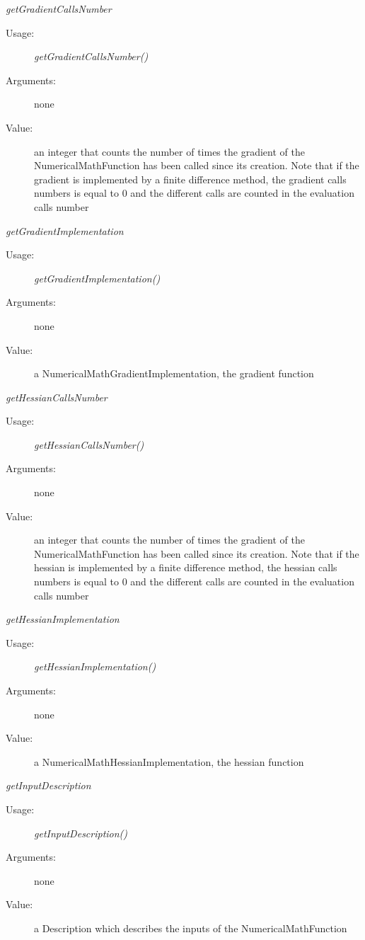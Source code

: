 \begin{description}
\begin{description}
\item \textit{getGradientCallsNumber}
\begin{description}
\item[Usage:] \textit{getGradientCallsNumber()}
\item[Arguments:] none
\item[Value:] an integer that counts the number of times the gradient of the NumericalMathFunction has been called since its creation. Note that if the gradient is implemented by a finite difference method, the gradient calls numbers is equal to 0 and the different calls are counted in the evaluation calls number
\end{description}
\bigskip

\item \textit{getGradientImplementation}
\begin{description}
\item[Usage:] \textit{getGradientImplementation()}
\item[Arguments:] none
\item[Value:] a NumericalMathGradientImplementation, the gradient function
\end{description}
\bigskip

\item \textit{getHessianCallsNumber}
\begin{description}
\item[Usage:] \textit{getHessianCallsNumber()}
\item[Arguments:] none
\item[Value:] an integer that counts the number of times the gradient of the NumericalMathFunction has been called since its creation. Note that if the hessian is implemented by a finite difference method, the hessian calls numbers is equal to 0 and the different calls are counted in the evaluation calls number
\end{description}
\bigskip

\item \textit{getHessianImplementation}
\begin{description}
\item[Usage:] \textit{getHessianImplementation()}
\item[Arguments:] none
\item[Value:] a NumericalMathHessianImplementation, the hessian function
\end{description}
\bigskip

\item \textit{getInputDescription}
\begin{description}
\item[Usage:] \textit{getInputDescription()}
\item[Arguments:] none
\item[Value:] a Description which describes the inputs of the NumericalMathFunction
\end{description}
\bigskip


\end{description}
\end{description}
